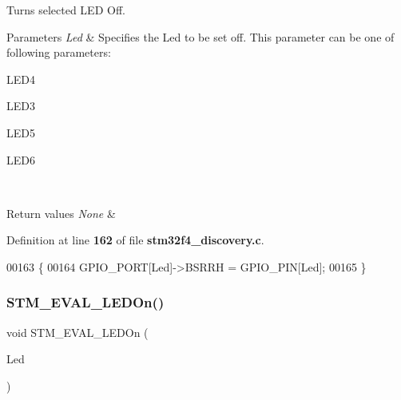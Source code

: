 Turns selected L\+ED Off. 


\begin{DoxyParams}{Parameters}
{\em Led} & Specifies the Led to be set off. This parameter can be one of following parameters\+: \begin{DoxyItemize}
\item L\+E\+D4 \item L\+E\+D3 \item L\+E\+D5 \item L\+E\+D6 \end{DoxyItemize}
\\
\hline
\end{DoxyParams}

\begin{DoxyRetVals}{Return values}
{\em None} & \\
\hline
\end{DoxyRetVals}


Definition at line \textbf{ 162} of file \textbf{ stm32f4\+\_\+discovery.\+c}.


\begin{DoxyCode}
00163 \{
00164   GPIO_PORT[Led]->BSRRH = GPIO_PIN[Led];  
00165 \}
\end{DoxyCode}
\mbox{\label{group__STM32F4__DISCOVERY__LOW__LEVEL__Exported__Functions_gad27fa430d867e6dde94cb7896fcc42fc}} 
\subsubsection{S\+T\+M\+\_\+\+E\+V\+A\+L\+\_\+\+L\+E\+D\+On()}
{\footnotesize\ttfamily void S\+T\+M\+\_\+\+E\+V\+A\+L\+\_\+\+L\+E\+D\+On (\begin{DoxyParamCaption}\item[{\textbf{ Led\+\_\+\+Type\+Def}}]{Led }\end{DoxyParamCaption})}



